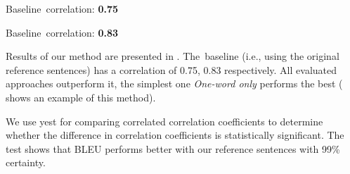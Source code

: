 \begin{table}[htb]
\begin{center}
\vspace{10pt}
Baseline~correlation: \textbf{0.75}
\vspace{10pt}

Baseline~correlation: \textbf{0.83}


\caption{Pearson's correlation of BLEU and the silver standard.}
\label{corrs:12:13}
\end{center}
\end{table}



Results of our method are presented in . The~baseline 
(i.e., using the original reference sentences) has a correlation of 0.75, 0.83
respectively. All evaluated approaches outperform it, the simplest one \textit{One-word only}
performs the best ( shows an example of this method).

We use yest for comparing correlated correlation coefficients 
\citep{meng1992comparing} to determine whether the difference in correlation
coefficients is statistically significant. The test shows that BLEU performs
better with our reference sentences with 99\% certainty. 

